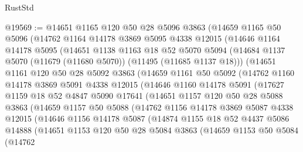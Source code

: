 \begin{lexlean}{RustStd}
\begin{coremodule}
@19569 := @14651
    @1165
    @120
    @50
    @28
    @5096
    @3863
    (@14659
      @1165
      @50
      @5096
      (@14762
        @1164
        @14178
        @3869
        @5095
        @4338
        @12015
        (@14646
          @1164
          @14178
          @5095
          (@14651
            @1138
            @1163
            @18
            @52
            @5070
            @5094
            (@14684 @1137 @5070 (@11679 (@11680 @5070)) (@11495 (@11685 @1137 @18)))
            (@14651
              @1161
              @120
              @50
              @28
              @5092
              @3863
              (@14659
                @1161
                @50
                @5092
                (@14762
                  @1160
                  @14178
                  @3869
                  @5091
                  @4338
                  @12015
                  (@14646
                    @1160
                    @14178
                    @5091
                    (@17627
                      @1159
                      @18
                      @52
                      @4847
                      @5090
                      @17641
                      (@14651
                        @1157
                        @120
                        @50
                        @28
                        @5088
                        @3863
                        (@14659
                          @1157
                          @50
                          @5088
                          (@14762
                            @1156
                            @14178
                            @3869
                            @5087
                            @4338
                            @12015
                            (@14646
                              @1156
                              @14178
                              @5087
                              (@14874
                                @1155
                                @18
                                @52
                                @4437
                                @5086
                                @14888
                                (@14651
                                  @1153
                                  @120
                                  @50
                                  @28
                                  @5084
                                  @3863
                                  (@14659
                                    @1153
                                    @50
                                    @5084
                                    (@14762

\end{coremodule}
\end{lexlean}
